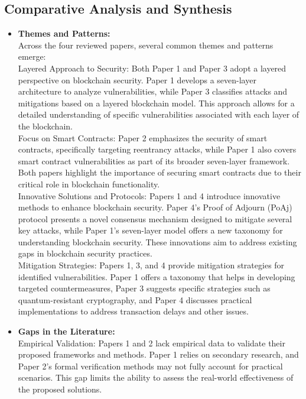 \documentclass[12pt,a4paper]{article}
\begin{document}
\subsection{Comparative Analysis and Synthesis}
\begin{itemize}
    \item \textbf{Themes and Patterns:} 
    \\
Across the four reviewed papers, several common themes and patterns emerge:
\\
Layered Approach to Security: Both Paper 1 and Paper 3 adopt a layered perspective on blockchain security. Paper 1 develops a seven-layer architecture to analyze vulnerabilities, while Paper 3 classifies attacks and mitigations based on a layered blockchain model. This approach allows for a detailed understanding of specific vulnerabilities associated with each layer of the blockchain.
\\
Focus on Smart Contracts: Paper 2 emphasizes the security of smart contracts, specifically targeting reentrancy attacks, while Paper 1 also covers smart contract vulnerabilities as part of its broader seven-layer framework. Both papers highlight the importance of securing smart contracts due to their critical role in blockchain functionality.
\\
Innovative Solutions and Protocols: Papers 1 and 4 introduce innovative methods to enhance blockchain security. Paper 4’s Proof of Adjourn (PoAj) protocol presents a novel consensus mechanism designed to mitigate several key attacks, while Paper 1’s seven-layer model offers a new taxonomy for understanding blockchain security. These innovations aim to address existing gaps in blockchain security practices.
\\
Mitigation Strategies: Papers 1, 3, and 4 provide mitigation strategies for identified vulnerabilities. Paper 1 offers a taxonomy that helps in developing targeted countermeasures, Paper 3 suggests specific strategies such as quantum-resistant cryptography, and Paper 4 discusses practical implementations to address transaction delays and other issues.
    \item \textbf{Gaps in the Literature:} 
    \\
Empirical Validation: Papers 1 and 2 lack empirical data to validate their proposed frameworks and methods. Paper 1 relies on secondary research, and Paper 2’s formal verification methods may not fully account for practical scenarios. This gap limits the ability to assess the real-world effectiveness of the proposed solutions.
\\

\end{itemize}
\end{document}
